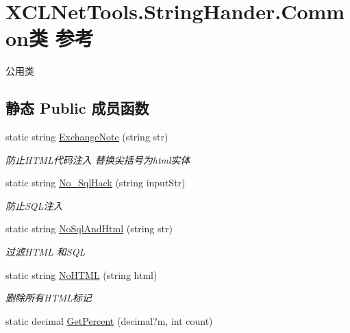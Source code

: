 \hypertarget{class_x_c_l_net_tools_1_1_string_hander_1_1_common}{\section{X\-C\-L\-Net\-Tools.\-String\-Hander.\-Common类 参考}
\label{class_x_c_l_net_tools_1_1_string_hander_1_1_common}
}


公用类  


\subsection*{静态 Public 成员函数}
\begin{DoxyCompactItemize}
\item 
static string \hyperlink{class_x_c_l_net_tools_1_1_string_hander_1_1_common_af6ad14eae24704cda11cc498849d9737}{Exchange\-Note} (string str)
\begin{DoxyCompactList}\small\item\em 防止\-H\-T\-M\-L代码注入 替换尖括号为html实体 \end{DoxyCompactList}\item 
static string \hyperlink{class_x_c_l_net_tools_1_1_string_hander_1_1_common_accef3263e7a42ba85bc76477e95f42f9}{No\-\_\-\-Sql\-Hack} (string input\-Str)
\begin{DoxyCompactList}\small\item\em 防止\-S\-Q\-L注入 \end{DoxyCompactList}\item 
static string \hyperlink{class_x_c_l_net_tools_1_1_string_hander_1_1_common_a67d87071f6b40c184fd81a6f2e5e923e}{No\-Sql\-And\-Html} (string str)
\begin{DoxyCompactList}\small\item\em 过滤\-H\-T\-M\-L 和\-S\-Q\-L \end{DoxyCompactList}\item 
static string \hyperlink{class_x_c_l_net_tools_1_1_string_hander_1_1_common_a7879e3cc9494f80e00f989cec68122e7}{No\-H\-T\-M\-L} (string html)
\begin{DoxyCompactList}\small\item\em 删除所有\-H\-T\-M\-L标记 \end{DoxyCompactList}\item 
static decimal \hyperlink{class_x_c_l_net_tools_1_1_string_hander_1_1_common_aeb6c0ff6a876aa51db57e41700becc5c}{Get\-Percent} (decimal?m, int count)

\end{DoxyCompactItemize}
